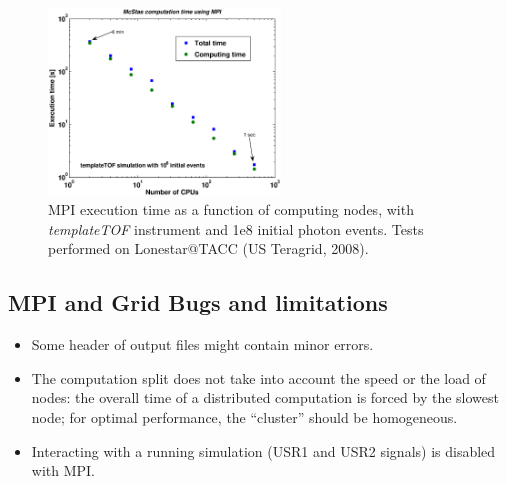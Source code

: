 \begin{figure}[htb!]
  \begin{center}
    \includegraphics[width=0.55\textwidth]{figures/mpi_efficiency.eps}
  \end{center}
\caption{\MCX MPI execution time as a function of computing nodes, with \textit{templateTOF} instrument and 1e8 initial photon events. Tests performed on Lonestar@TACC (US Teragrid, 2008).}
\label{fig:mpi_efficiency}
\end{figure}

\subsection{MPI and Grid Bugs and limitations}

\begin{itemize}
\item Some header of output files might contain minor errors.
\item The computation split does not take into account the speed or the
  load of nodes: the overall time of a distributed computation is
  forced by the slowest node; for optimal performance, the ``cluster''
  should be homogeneous.
\item Interacting with a running simulation (USR1 and USR2 signals) is disabled 
  with MPI.
\end{itemize}

